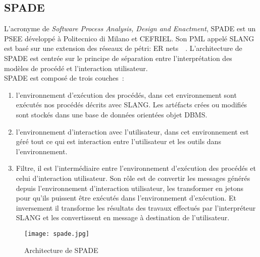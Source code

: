 \subsection*{SPADE}
L'acronyme de \emph{Software Process Analysis, Design and Enactment}, SPADE est un PSEE développé à Politecnico di Milano et CEFRIEL. Son PML appelé SLANG est basé sur une extension des réseaux de pétri: ER nets~\cite{link1}~\cite{link2}. L'architecture de SPADE est centrée sur le principe de séparation entre l'interprétation des modèles de procédé et l'interaction utilisateur. \\
SPADE est composé de trois couches~\cite{link1}:
\begin{enumerate}
\item l'environnement d'exécution des procédés, dans cet environnement sont exécutés nos procédés décrits avec SLANG. Les artéfacts crées ou modifiés sont stockés dans une base de données orientées objet DBMS.
\item l'environnement d'interaction avec l'utilisateur, dans cet environnement est géré tout ce qui est interaction entre l'utilisateur et les outils dans l'environnement.
\item Filtre, il est l'intermédiaire entre l'environnement d'exécution des procédés et celui d'interaction utilisateur. Son rôle est de convertir les messages générés depuis l'environnement d'interaction utilisateur, les transformer en jetons pour qu'ils puissent être exécutés dans l'environnement d'exécution. Et inversement il transforme les résultats des travaux effectués par l'interpréteur SLANG et les convertissent en message à destination de l'utilisateur.
\end{enumerate}
\begin{figure}[h]
\centering
\texttt{[image: spade.jpg]}
\caption{\label{spadeArch}Architecture de SPADE~\cite{spadeArch}}
\end{figure}


